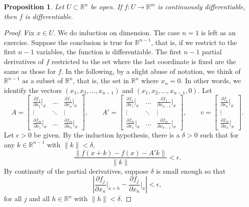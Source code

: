 \documentclass[12pt,openany]{book}
\newcommand{\snorm}[1]{\lVert {#1} \rVert}
\newcommand{\abs}[1]{\left\lvert {#1} \right\rvert}
\newcommand{\R}{{\mathbb{R}}}
\theoremstyle{plain}
\newtheorem{prop}[thm]{Proposition}
\theoremstyle{remark}
\theoremstyle{definition}
\theoremstyle{exercise}
\theoremstyle{example}
\begin{document}
\begin{prop} \label{mv:prop:contdiffpartials}
Let $U \subset \R^n$ be open.
If $f \colon U \to \R^m$ is
continuously differentiable, then
$f$ is differentiable.
\end{prop}

\begin{proof}
Fix $x \in U$.  We do induction on dimension.  The case $n=1$ is left
as an exercise.
Suppose the conclusion is true for $\R^{n-1}$,
that is,
if we restrict to the first $n-1$ variables, the function is differentiable.
The first $n-1$
partial derivatives of $f$ restricted to the set where the last coordinate is
fixed are the same as those for $f$.
In the following, by a slight abuse of notation,
we think of $\R^{n-1}$ as a subset of $\R^n$, that is, the set in $\R^n$ where $x_n = 0$.
In other words, we identify the vectors $(x_1,x_2,\ldots,x_{n-1})$ and
$(x_1,x_2,\ldots,x_{n-1},0)$.
Let
\begin{equation*}
A = 
\begin{bmatrix}
\frac{\partial f_1}{\partial x_1}\big|_x
& \ldots &
\frac{\partial f_1}{\partial x_n}\big|_x
\\
\vdots & \ddots & \vdots
\\
\frac{\partial f_m}{\partial x_1}\big|_x
& \ldots &
\frac{\partial f_m}{\partial x_n}\big|_x
\end{bmatrix} ,
\qquad
A' = 
\begin{bmatrix}
\frac{\partial f_1}{\partial x_1}\big|_x
& \ldots &
\frac{\partial f_1}{\partial x_{n-1}}\big|_x
\\
\vdots & \ddots & \vdots
\\
\frac{\partial f_m}{\partial x_1}\big|_x
& \ldots &
\frac{\partial f_m}{\partial x_{n-1}}\big|_x
\end{bmatrix} ,
\qquad
v = 
\begin{bmatrix}
\frac{\partial f_1}{\partial x_n}\big|_x
\\
\vdots
\\
\frac{\partial f_m}{\partial x_n}\big|_x
\end{bmatrix} .
\end{equation*}
Let $\epsilon > 0$ be given.  By the induction hypothesis, there
is a $\delta > 0$ such that
for any $k \in \R^{n-1}$ with $\snorm{k} < \delta$,
\begin{equation*}
\frac{\snorm{f(x+k) - f(x) - A' k}}{\snorm{k}} < \epsilon .
\end{equation*}
By continuity of the partial derivatives, suppose $\delta$ is small
enough so that
\begin{equation*}
\abs{\frac{\partial f_j}{\partial x_n}\Big|_{x+h}
      - \frac{\partial f_j}{\partial x_n}\Big|_{x}} < \epsilon ,
\end{equation*}
for all $j$ and all $h \in \R^n$ with $\snorm{h} < \delta$.


\end{proof}
\end{document}
